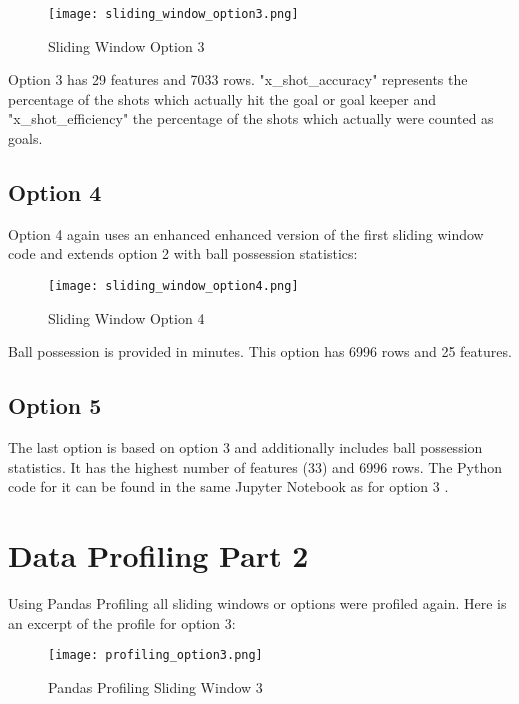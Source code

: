 \begin{figure}[H]
\begin{center}
\texttt{[image: sliding\_window\_option3.png]}
\end{center}
\caption{Sliding Window Option 3}
\label{fig:sliding_window_option3}
\end{figure}



Option 3 has 29 features and 7033 rows. "x\_shot\_accuracy" represents the percentage of the shots which actually hit the goal or goal keeper and "x\_shot\_efficiency" the percentage of the shots which actually were counted as goals.


\subsection {Option 4}

Option 4 again uses an enhanced enhanced version \cite{sliding04} of the first sliding window code and extends option 2 with ball possession statistics:

\begin{figure}[H]
\begin{center}
\texttt{[image: sliding\_window\_option4.png]}
\end{center}
\caption{Sliding Window Option 4}
\label{fig:sliding_window_option4}
\end{figure}

Ball possession is provided in minutes. This option has 6996 rows and 25 features.

\subsection {Option 5}
The last option is based on option 3 and additionally includes ball possession statistics. It has the highest number of features (33) and 6996 rows. The Python code for it can be found in the same Jupyter Notebook as for option 3 \cite{jupyter_sliding}.


\section {Data Profiling Part 2}

Using Pandas Profiling all sliding windows or options were profiled again. Here is an excerpt of the profile for option 3:

\begin{figure}[H]
\begin{center}
\texttt{[image: profiling\_option3.png]}
\end{center}
\caption{Pandas Profiling Sliding Window 3}
\label{fig:profiling_option3}
\end{figure}

